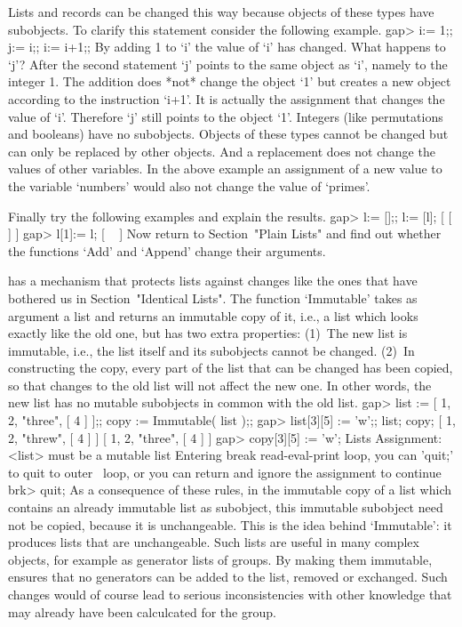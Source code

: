 Lists and records can be changed this way because {\GAP} objects of these
types have subobjects.
To clarify this statement consider the following example.
\beginexample
gap> i:= 1;; j:= i;; i:= i+1;; 
\endexample
By adding 1 to `i' the value of `i' has  changed.   What  happens to `j'?
After the second statement `j' points to the same object  as `i',  namely
to the  integer 1.  The  addition  does *not* change  the object `1'  but
creates a new object according  to the instruction `i+1'.  It is actually
the assignment that changes the value of `i'.  Therefore `j' still points
to  the object `1'.  Integers  (like permutations and  booleans)  have no
subobjects.  Objects  of these types  cannot  be  changed but can only be
replaced by other objects.   And a replacement does not change the values
of other variables.  In the above example an assignment of a new value to
the variable `numbers' would also not change the value of `primes'.

Finally try the following examples and explain the results.
\beginexample
gap> l:= [];; l:= [l];
[ [  ] ]
gap> l[1]:= l;
[ ~ ]
\endexample
Now return to Section~"Plain Lists" and find out whether the functions
`Add' and `Append' change their arguments.


{\GAP} has a mechanism that protects lists against  changes like the ones
that have bothered   us in    Section~"Identical Lists". The     function
`Immutable' takes as argument a list and returns an immutable copy of it,
i.e., a list  which  looks exactly like the   old one, but has  two extra
properties:
(1)~The new list is immutable, i.e.,  the list itself and its subobjects 
    cannot be changed.
(2)~In constructing the copy, every part of  the list that can be changed
    has been copied, so that changes to the  old list will not affect the
    new one.  In other words, the new  list has no  mutable subobjects in
    common with the old list.
\begintt
gap> list := [ 1, 2, "three", [ 4 ] ];; copy := Immutable( list );;
gap> list[3][5] := 'w';; list; copy;
[ 1, 2, "threw", [ 4 ] ]
[ 1, 2, "three", [ 4 ] ]
gap> copy[3][5] := 'w';
Lists Assignment: <list> must be a mutable list
Entering break read-eval-print loop, you can 'quit;' to quit to outer \
loop,
or you can return and ignore the assignment to continue
brk> quit;
\endtt
As a consequence of  these rules, in the  immutable copy of a list  which
contains an already immutable list as subobject, this immutable subobject
need not be copied,  because it is unchangeable. This is the idea  behind
`Immutable': it produces lists that are unchangeable. Such lists are
useful in many complex {\GAP} objects,  for example as generator lists of
groups. By  making them immutable, {\GAP}  ensures that no generators can
be added to the list, removed or exchanged. Such  changes would of course
lead  to serious inconsistencies with  other  knowledge that may already
have been calculcated for the group.

